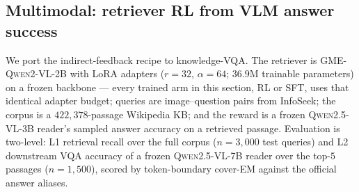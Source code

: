 %
\subsection{Multimodal: retriever RL from VLM answer success}
\label{sec:mm_rag}

We port the indirect-feedback recipe to knowledge-VQA. The retriever is
\textsc{GME-Qwen2-VL-2B} with LoRA adapters ($r{=}32$, $\alpha{=}64$; $36.9$M trainable
parameters) on a frozen backbone --- every trained arm in this section, RL or SFT, uses that
identical adapter budget;
queries are image--question pairs from InfoSeek; the corpus is a $422{,}378$-passage Wikipedia
KB; and the reward is a frozen \textsc{Qwen2.5-VL-3B} reader's sampled answer accuracy on a
retrieved passage. Evaluation is two-level: L1 retrieval recall over the full corpus
($n{=}3{,}000$ test queries) and L2 downstream VQA accuracy of a frozen
\textsc{Qwen2.5-VL-7B} reader over the top-$5$ passages ($n{=}1{,}500$), scored by
token-boundary cover-EM against the official answer aliases.

